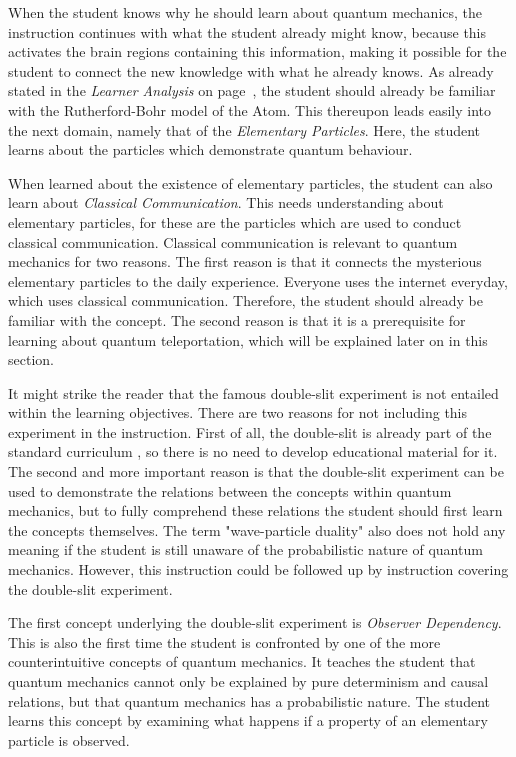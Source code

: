 \documentclass[11pt,twoside]{report} %
\begin{document}
When the student knows why he should learn about quantum mechanics, the instruction continues with what the student already might know, because this activates the brain regions containing this information, making it possible for the student to connect the new knowledge with what he already knows. As already stated in the \emph{Learner Analysis} on page~\pageref{ch:learneranalysis}, the student should already be familiar with the Rutherford-Bohr model of the Atom. This thereupon leads easily into the next domain, namely that of the \emph{Elementary Particles}. Here, the student learns about the particles which demonstrate quantum behaviour.

When learned about the existence of elementary particles, the student can also learn about \emph{Classical Communication}. This needs understanding about elementary particles, for these are the particles which are used to conduct classical communication. Classical communication is relevant to quantum mechanics for two reasons. The first reason is that it connects the mysterious elementary particles to the daily experience. Everyone uses the internet everyday, which uses classical communication. Therefore, the student should already be familiar with the concept. The second reason is that it is a prerequisite for learning about quantum teleportation, which will be explained later on in this section.

It might strike the reader that the famous double-slit experiment is not entailed within the learning objectives. There are two reasons for not including this experiment in the instruction. First of all, the double-slit is already part of the standard curriculum \cite{eindexamen2015}, so there is no need to develop educational material for it. The second and more important reason is that the double-slit experiment can be used to demonstrate the relations between the concepts within quantum mechanics, but to fully comprehend these relations the student should first learn the concepts themselves. The term "wave-particle duality" also does not hold any meaning if the student is still unaware of the probabilistic nature of quantum mechanics. However, this instruction could be followed up by instruction covering the double-slit experiment.

The first concept underlying the double-slit experiment is \emph{Observer Dependency}. This is also the first time the student is confronted by one of the more counterintuitive concepts of quantum mechanics. It teaches the student that quantum mechanics cannot only be explained by pure determinism and causal relations, but that quantum mechanics has a probabilistic nature. The student learns this concept by examining what happens if a property of an elementary particle is observed.
\end{document}
